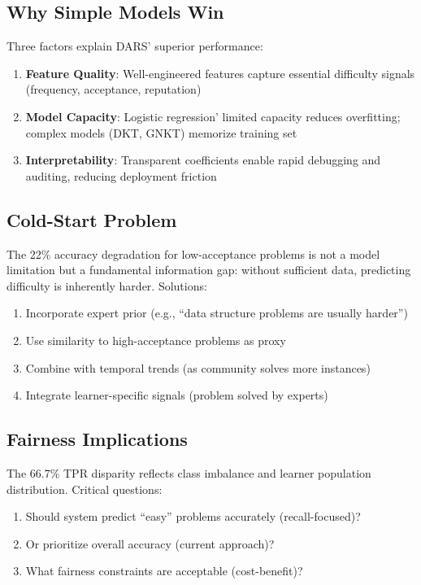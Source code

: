 \documentclass[conference]{IEEEtran}
\begin{document}
\subsection{Why Simple Models Win}

Three factors explain DARS' superior performance:

\begin{enumerate}
    \item \textbf{Feature Quality}: Well-engineered features capture essential difficulty signals (frequency, acceptance, reputation)
    \item \textbf{Model Capacity}: Logistic regression' limited capacity reduces overfitting; complex models (DKT, GNKT) memorize training set
    \item \textbf{Interpretability}: Transparent coefficients enable rapid debugging and auditing, reducing deployment friction
\end{enumerate}

\subsection{Cold-Start Problem}

The 22\% accuracy degradation for low-acceptance problems is not a model limitation but a fundamental information gap: without sufficient data, predicting difficulty is inherently harder. Solutions:

\begin{enumerate}
    \item Incorporate expert prior (e.g., ``data structure problems are usually harder'')
    \item Use similarity to high-acceptance problems as proxy
    \item Combine with temporal trends (as community solves more instances)
    \item Integrate learner-specific signals (problem solved by experts)
\end{enumerate}

\subsection{Fairness Implications}

The 66.7\% TPR disparity reflects class imbalance and learner population distribution. Critical questions:

\begin{enumerate}
    \item Should system predict ``easy'' problems accurately (recall-focused)?
    \item Or prioritize overall accuracy (current approach)?
    \item What fairness constraints are acceptable (cost-benefit)?
\end{enumerate}
\end{document}
